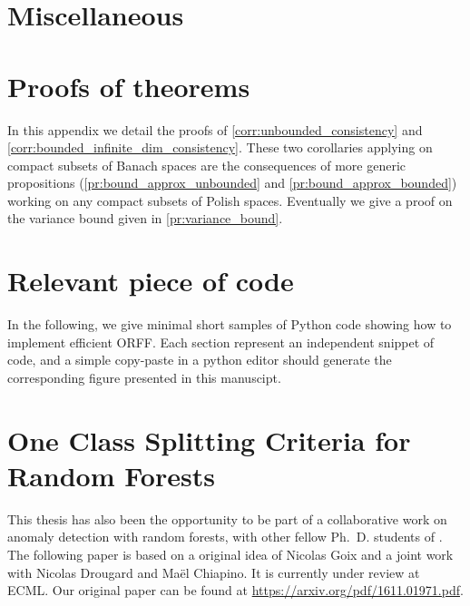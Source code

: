 
\chapter{Miscellaneous}
\label{ch:misc}
\bigskip
\begin{justify}
\end{justify}
\minitoc



\chapter{Proofs of theorems}
\label{ch:proof_of_theorems}
\bigskip
\begin{justify}
In this appendix we detail the proofs of \cref{corr:unbounded_consistency} and
\cref{corr:bounded_infinite_dim_consistency}. These two corollaries applying on
compact subsets of Banach spaces are the consequences of more generic
propositions (\cref{pr:bound_approx_unbounded} and \cref{pr:bound_approx_bounded})
working on any compact subsets of Polish spaces. Eventually we give a proof on
the variance bound given in \cref{pr:variance_bound}.
\end{justify}
\minitoc



\chapter{Relevant piece of code}
\label{ch:relevant_piece_of_code}
\bigskip
\begin{justify}
In the following, we give minimal short samples of Python code showing how to
implement efficient \acs{ORFF}. Each section represent an independent snippet
of code, and a simple copy-paste in a python editor should generate the
corresponding figure presented in this manuscipt.
\end{justify}
\minitoc


\chapter{One Class Splitting Criteria for Random Forests}
\label{ch:one_class_splitting}
\bigskip
\begin{justify}
This thesis has also been the opportunity to be part of a
collaborative work on anomaly detection with random forests, with other fellow
Ph.~D. students of \myUniTP. The following paper \citet{goix2016one} is based
on a original idea of Nicolas Goix and a joint work with Nicolas Drougard and
Ma\"el Chiapino. It is currently under review at \acs{ECML}. Our original paper
can be found at
\url{https://arxiv.org/pdf/1611.01971.pdf}.
\end{justify}
\minitoc


